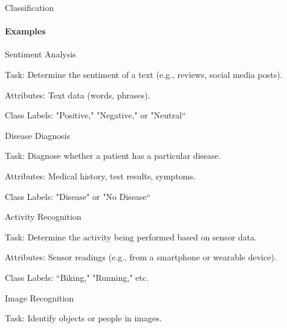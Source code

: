 \documentclass[aspectratio=169]{beamer}
\begin{document}
\begin{frame}{Classification}
    \framesubtitle{Examples}

    \begin{minipage}[t]{.49\textwidth}
        \begin{tugitemize}
            \item \small Sentiment Analysis
            \begin{tugitemize}
                \item \scriptsize Task: Determine the sentiment of a text (e.g., reviews, social media posts).
                \item \scriptsize Attributes: Text data (words, phrases).
                \item \scriptsize Class Labels: "Positive," "Negative," or "Neutral“
            \end{tugitemize}
            \item \small Disease Diagnosis
            \begin{tugitemize}
                \item \scriptsize Task: Diagnose whether a patient has a particular disease.
                \item \scriptsize Attributes: Medical history, test results, symptoms.
                \item \scriptsize Class Labels: "Disease" or "No Disease“
            \end{tugitemize}
            \item \small Activity Recognition
            \begin{tugitemize}
                \item \scriptsize Task: Determine the activity being performed based on sensor data.
                \item \scriptsize Attributes: Sensor readings (e.g., from a smartphone or wearable device).
                \item \scriptsize Class Labels: “Biking," "Running," etc.
            \end{tugitemize}
        \end{tugitemize}
    \end{minipage}
    \hfill
    \begin{minipage}[t]{.49\textwidth}
        \begin{tugitemize}
            \item \small Image Recognition
            \begin{tugitemize}
                \item \scriptsize Task: Identify objects or people in images.

\end{tugitemize}
\end{tugitemize}
\end{minipage}
\end{frame}
\end{document}
